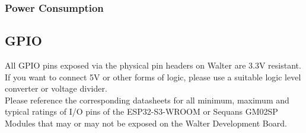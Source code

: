 \documentclass[11pt]{article}
\begin{document}
\subsubsection{Power Consumption}
\subsection{GPIO} \label{gpio}
All GPIO pins exposed via the physical pin headers on Walter are 3.3V resistant. If you want to connect 5V or other forms of logic, please use a suitable logic level converter or voltage divider.\\

Please reference the corresponding datasheets for all minimum, maximum and typical ratings of I/O pins of the ESP32-S3-WROOM or Sequans GM02SP Modules that may or may not be exposed on the Walter Development Board.

\newpage
\end{document}
